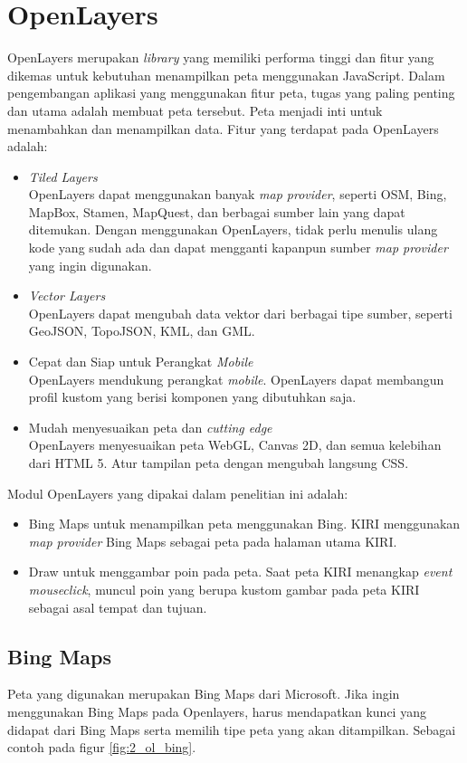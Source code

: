 	
\section{OpenLayers}
\label{sec:openlayers}
OpenLayers \cite{openlayersbook} merupakan \textit{library} yang memiliki performa tinggi dan fitur yang dikemas untuk kebutuhan menampilkan peta menggunakan JavaScript. Dalam pengembangan aplikasi yang menggunakan fitur peta, tugas yang paling penting dan utama adalah membuat peta tersebut. Peta menjadi inti untuk menambahkan dan menampilkan data. Fitur yang terdapat pada OpenLayers adalah:

\begin{itemize}
\item \textit{Tiled Layers}\\
			OpenLayers dapat menggunakan banyak \textit{map provider}, seperti OSM, Bing, MapBox, Stamen, MapQuest, dan berbagai sumber lain yang dapat ditemukan. Dengan menggunakan OpenLayers, tidak perlu menulis ulang kode yang sudah ada dan dapat mengganti kapanpun sumber \textit{map provider} yang ingin digunakan.
	\item \textit{Vector Layers}\\
			OpenLayers dapat mengubah data vektor dari berbagai tipe sumber, seperti GeoJSON, TopoJSON, KML, dan GML.
	\item Cepat dan Siap untuk Perangkat \textit{Mobile}\\
			OpenLayers mendukung perangkat \textit{mobile}. OpenLayers dapat membangun profil kustom yang berisi komponen yang dibutuhkan saja.
	\item Mudah menyesuaikan peta dan \textit{cutting edge}\\
			OpenLayers menyesuaikan peta WebGL, Canvas 2D, dan semua kelebihan dari HTML 5. Atur tampilan peta dengan mengubah langsung CSS.
\end{itemize}

Modul OpenLayers yang dipakai dalam penelitian ini adalah:
\begin{itemize}
	\item 	Bing Maps untuk menampilkan peta menggunakan Bing. KIRI menggunakan \textit{map provider} Bing Maps sebagai peta pada halaman utama KIRI. 
	\item Draw untuk menggambar poin pada peta. Saat peta KIRI menangkap \textit{event mouseclick}, muncul poin yang berupa kustom gambar pada peta KIRI sebagai asal tempat dan tujuan. 
\end{itemize}

\subsection{Bing Maps}
Peta yang digunakan merupakan Bing Maps dari Microsoft. Jika ingin menggunakan Bing Maps pada Openlayers, harus mendapatkan kunci yang didapat dari Bing Maps serta memilih tipe peta yang akan ditampilkan. Sebagai contoh pada figur \ref{fig:2_ol_bing}.

